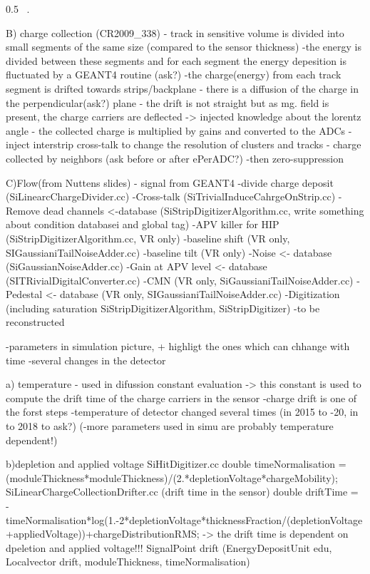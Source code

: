                  {0.5}       %
                 { ~\cite{website:simuBasics}. }


B) charge collection (CR2009\_338)
- track in sensitive volume is divided into small segments of the same size (compared to the sensor thickness)
-the energy is divided between these segments and for each segment the energy depesition is fluctuated by a GEANT4 routine (ask?)
-the charge(energy) from each track segment is drifted towards strips/backplane
- there is a diffusion of the charge in the perpendicular(ask?) plane
- the drift is not straight but as mg. field is present, the charge carriers are deflected -> injected knowledge about the lorentz angle
- the collected charge is multiplied by gains and converted to the ADCs
- inject interstrip cross-talk to change the resolution of clusters and tracks - charge collected by neighbors (ask before or after ePerADC?)
-then zero-suppression

C)Flow(from Nuttens slides)
- signal from GEANT4
-divide charge deposit (SiLinearcChargeDivider.cc)
-Cross-talk (SiTrivialInduceCahrgeOnStrip.cc)
-Remove dead channels <-database (SiStripDigitizerAlgorithm.cc, write something about condition databasei and global tag)
-APV killer for HIP (SiStripDigitizerAlgorithm.cc, VR only)
-baseline shift (VR only, SIGaussianiTailNoiseAdder.cc)
-baseline tilt (VR only)
-Noise <- database (SiGaussianNoiseAdder.cc)
-Gain at APV level <- database (SITRivialDigitalConverter.cc)
-CMN (VR only, SiGaussianiTailNoiseAdder.cc)
-Pedestal <- database (VR only, SIGaussianiTailNoiseAdder.cc)
-Digitization (including saturation SiStripDigitizerAlgorithm, SiStripDigitizer)
-to be reconstructed

-parameters in simulation picture, + highligt the ones which can chhange with time
-several changes in the detector

a) temperature
- used in difussion constant evaluation -> this constant is used to compute the drift time of the charge carriers in the sensor
-charge drift is one of the forst steps
-temperature of detector changed several times (in 2015 to -20, in to 2018 to ask?)
(-more parameters used in simu are probably temperature dependent!)

b)depletion and applied voltage
SiHitDigitizer.cc
double timeNormalisation = (moduleThickness*moduleThickness)/(2.*depletionVoltage*chargeMobility);
SiLinearChargeCollectionDrifter.cc (drift time in the sensor)
double driftTime = -timeNormalisation*log(1.-2*depletionVoltage*thicknessFraction/(depletionVoltage+appliedVoltage))+chargeDistributionRMS; 
-> the drift time is dependent on dpeletion and applied voltage!!!
SignalPoint drift (EnergyDepositUnit edu, Localvector drift, moduleThickness, timeNormalisation)

